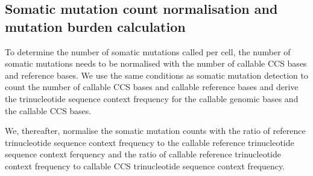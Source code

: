 \subsection{Somatic mutation count normalisation and mutation burden calculation}

To determine the number of somatic mutations called per cell, the number of somatic mutations needs to be normalised with the number of callable CCS bases and reference bases. We use the same conditions as somatic mutation detection to count the number of callable CCS bases and callable reference bases and derive the trinucleotide sequence context frequency for the callable genomic bases and the callable CCS bases. 


We, thereafter, normalise the somatic mutation counts with the ratio of reference trinucleotide sequence context frequency to the callable reference trinucleotide sequence context ferquency and the ratio of callable reference trinucleotide context frequency to callable CCS trinucleotide sequence context frequency.


%
%
%
%
%
%
%
%
%

